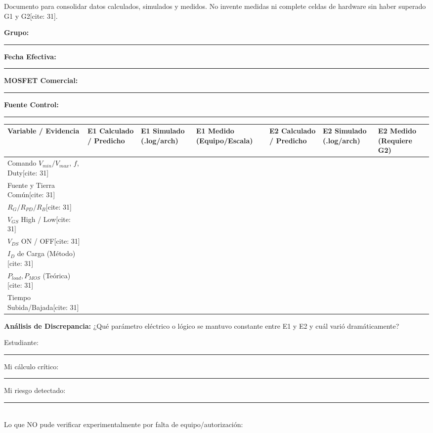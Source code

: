 \documentclass[10pt, a4paper, landscape]{article}
\begin{document}
\begin{tcolorbox}[colback=ucbblue!5, colframe=ucbblue, title=\textbf{Plantilla Única de Trazabilidad E1 y E2[cite: 31]}]
    Documento para consolidar datos calculados, simulados y medidos. No invente medidas ni complete celdas de hardware sin haber superado G1 y G2[cite: 31].
\end{tcolorbox}

\noindent\textbf{Grupo:} \rule{1.5cm}{0.15mm} \quad \textbf{Fecha Efectiva:} \rule{2cm}{0.15mm} \quad \textbf{MOSFET Comercial:} \rule{3cm}{0.15mm} \quad \textbf{Fuente Control:} \rule{2.5cm}{0.15mm}

\vspace{0.2cm}
\renewcommand{\arraystretch}{1.8}
\begin{tabularx}{\textwidth}{|>{\raggedright\arraybackslash}p{3cm}|>{\raggedright\arraybackslash}X|>{\raggedright\arraybackslash}X|>{\raggedright\arraybackslash}X|>{\raggedright\arraybackslash}X|>{\raggedright\arraybackslash}X|>{\raggedright\arraybackslash}X|}
\hline
\rowcolor{gray!20}
\textbf{Variable / Evidencia} & \textbf{E1 Calculado / Predicho} & \textbf{E1 Simulado (.log/arch)} & \textbf{E1 Medido (Equipo/Escala)} & \textbf{E2 Calculado / Predicho} & \textbf{E2 Simulado (.log/arch)} & \textbf{E2 Medido (Requiere G2)} \\ \hline
Comando $V_{min}/V_{max}$, $f$, Duty[cite: 31] & & & & & & \\ \hline
Fuente y Tierra Común[cite: 31] & & & & & & \\ \hline
$R_G / R_{PD} / R_B$[cite: 31] & & & & & & \\ \hline
$V_{GS}$ High / Low[cite: 31] & & & & & & \\ \hline
$V_{DS}$ ON / OFF[cite: 31] & & & & & & \\ \hline
$I_D$ de Carga (Método)[cite: 31] & & & & & & \\ \hline
$P_{load}, P_{MOS}$ (Teórica)[cite: 31] & & & & & & \\ \hline
Tiempo Subida/Bajada[cite: 31] & & & & & & \\ \hline
\end{tabularx}

\vspace{0.4cm}
\textbf{Análisis de Discrepancia:} ¿Qué parámetro eléctrico o lógico se mantuvo constante entre E1 y E2 y cuál varió dramáticamente? \hrulefill \\[0.2cm] \hrulefill

\vspace{0.3cm}
\begin{tcolorbox}[colback=white, colframe=black, title=\textbf{Registro Individual de Competencia (Firmado por estudiante)[cite: 31]}]
    Estudiante: \rule{4cm}{0.15mm} \quad Mi cálculo crítico: \rule{3cm}{0.15mm} \quad Mi riesgo detectado: \rule{3cm}{0.15mm} \\[0.2cm]
    Lo que NO pude verificar experimentalmente por falta de equipo/autorización: \hrulefill
\end{tcolorbox}
\end{document}

